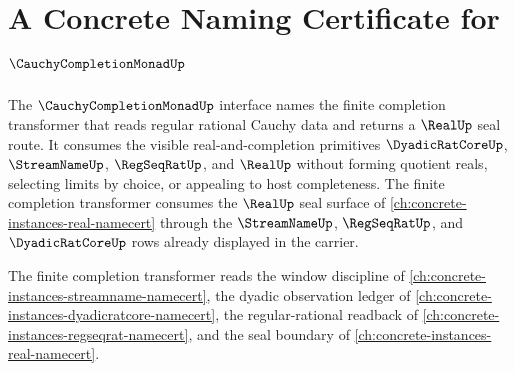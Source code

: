 \chapter{A Concrete Naming Certificate for $\CauchyCompletionMonadUp$}
\label{ch:concrete-instances-cauchycompletionmonad-namecert}

The $\CauchyCompletionMonadUp$ interface names the finite completion transformer that reads regular rational Cauchy data and returns a $\RealUp$ seal route. It consumes the visible real-and-completion primitives $\DyadicRatCoreUp$, $\StreamNameUp$, $\RegSeqRatUp$, and $\RealUp$ without forming quotient reals, selecting limits by choice, or appealing to host completeness. The finite completion transformer consumes the $\RealUp$ seal surface of \autoref{ch:concrete-instances-real-namecert} through the $\StreamNameUp$, $\RegSeqRatUp$, and $\DyadicRatCoreUp$ rows already displayed in the carrier.

The finite completion transformer reads the window discipline of \autoref{ch:concrete-instances-streamname-namecert}, the dyadic observation ledger of \autoref{ch:concrete-instances-dyadicratcore-namecert}, the regular-rational readback of \autoref{ch:concrete-instances-regseqrat-namecert}, and the seal boundary of \autoref{ch:concrete-instances-real-namecert}.

